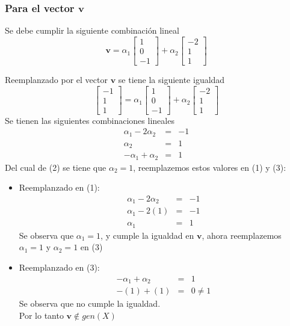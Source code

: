 \subsubsection{Para el vector $\mathbf{v}$}
Se debe cumplir la siguiente combinación lineal
\[
\mathbf{v} = {\alpha}_{1}
\begin{bmatrix}
1 \\ 
0 \\ 
-1
\end{bmatrix}
+ {\alpha}_{2}
\begin{bmatrix}
-2 \\ 
1 \\ 
1
\end{bmatrix}
\]

Reemplanzado por el vector $\mathbf{v}$ se tiene la siguiente igualdad
\[
\begin{bmatrix}
-1 \\ 
1 \\ 
1
\end{bmatrix}
= {\alpha}_{1}
\begin{bmatrix}
1 \\ 
0 \\ 
-1
\end{bmatrix}
+ {\alpha}_{2}
\begin{bmatrix}
-2 \\ 
1 \\ 
1
\end{bmatrix}
\]
\setcounter{equation}{0}
Se tienen las siguientes combinaciones lineales
\begin{eqnarray}
    {\alpha}_{1} - 2 {\alpha}_{2} &=& -1 \\
    {\alpha}_{2} &=& 1 \\
    -{\alpha}_{1} + {\alpha}_{2} &=& 1
\end{eqnarray}
Del cual de (2) se tiene que $\alpha_2 = 1$, reemplazemos estos valores en (1) y (3):
\begin{itemize}
     \item Reemplanzado en (1):
     \begin{eqnarray}
         {\alpha}_{1} - 2 {\alpha}_{2} &=& -1 \nonumber \\
         {\alpha}_{1} - 2 (1) &=& -1 \nonumber \\
         {\alpha}_{1} &=& 1 \nonumber
     \end{eqnarray}
     Se observa que ${\alpha}_{1} = 1$, y cumple la igualdad en $\mathbf{v}$, ahora reemplazemos ${\alpha}_{1} = 1$ y ${\alpha}_{2} = 1$ en (3) 
     \item Reemplanzado en (3):
     \begin{eqnarray}
         -{\alpha}_{1} + {\alpha}_{2} &=& 1 \nonumber \\
         -(1) + (1) &=& 0 \neq 1 \nonumber
     \end{eqnarray}
     Se observa que no cumple la igualdad.\\
     Por lo tanto $\mathbf{v} \notin gen(X)$
 \end{itemize} 

